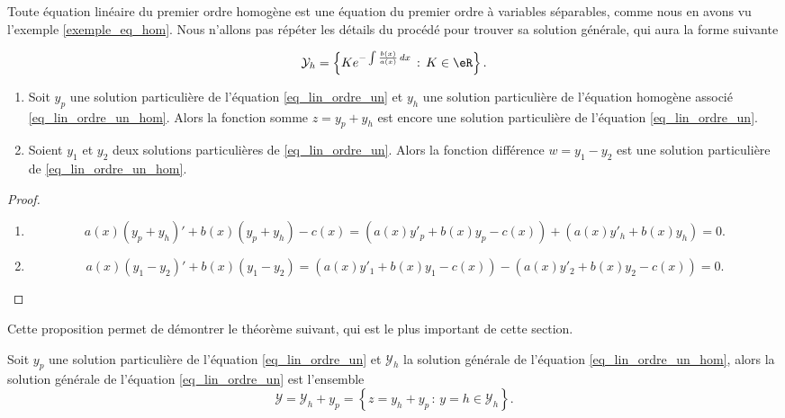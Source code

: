 Toute équation linéaire du premier ordre homogène est une équation du premier ordre à variables séparables, comme nous en avons vu l'exemple \ref{exemple_eq_hom}. Nous n'allons pas répéter les détails du procédé pour trouver sa solution générale, qui aura la forme suivante
\begin{Aretenir}
	\begin{equation}\label{solgeneqlinordre1}
		\mathcal{Y}_h=\left\{Ke^{-\int\frac{b(x)}{a(x)}\, dx}\,:\, K\in\eR\right\}.
	\end{equation}
\end{Aretenir}
\begin{proposition}
	\begin{enumerate}
		\item Soit \( y_p\) une solution particulière de l'équation \eqref{eq_lin_ordre_un} et \( y_h\) une solution particulière de l'équation homogène associé \eqref{eq_lin_ordre_un_hom}. Alors la fonction somme \( z= y_p+y_h\) est encore une solution particulière de l'équation \eqref{eq_lin_ordre_un}.
		\item Soient \( y_1\) et \( y_2\) deux solutions particulières de \eqref{eq_lin_ordre_un}. Alors la fonction différence \( w = y_1-y_2\) est une solution particulière de \eqref{eq_lin_ordre_un_hom}.
	\end{enumerate}
\end{proposition}
\begin{proof}
	\begin{enumerate}
		\item
		      \begin{equation}
			      a(x)\left(y_p+y_h\right)' + b(x)\left(y_p+y_h\right)-c(x)  =\left( a(x)y'_p+ b(x)y_p-c(x)\right) + \left( a(x)y'_h+ b(x)y_h\right) = 0.
		      \end{equation}
		\item
		      \begin{equation}
			      a(x)\left(y_1-y_2\right)' + b(x)\left(y_1-y_2\right) =\left( a(x)y'_1+ b(x)y_1-c(x)\right) -\left( a(x)y'_2+ b(x)y_2-c(x)\right) = 0.
		      \end{equation}
	\end{enumerate}
\end{proof}
Cette proposition permet de démontrer le théorème suivant, qui est le plus important de cette section.
\begin{theorem}
	Soit \( y_p\) une solution particulière de l'équation \eqref{eq_lin_ordre_un} et \( \mathcal{Y}_h\) la solution générale de l'équation \eqref{eq_lin_ordre_un_hom}, alors la solution générale de l'équation \eqref{eq_lin_ordre_un} est l'ensemble
	\begin{equation}
		\mathcal{Y} = \mathcal{Y}_h +y_p = \left\{z= y_h + y_p\,:\, y=h \in\mathcal{Y}_h \right\}.
	\end{equation}
\end{theorem}
